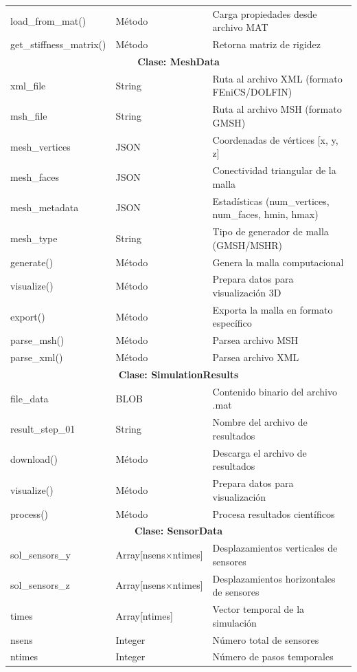 \begin{longtable}{|p{3cm}|p{2cm}|p{8cm}|}
load\_from\_mat() & Método & Carga propiedades desde archivo MAT \\
get\_stiffness\_matrix() & Método & Retorna matriz de rigidez \\
\hline
\multicolumn{3}{|c|}{\textbf{Clase: MeshData}} \\
\hline
xml\_file & String & Ruta al archivo XML (formato FEniCS/DOLFIN) \\
msh\_file & String & Ruta al archivo MSH (formato GMSH) \\
mesh\_vertices & JSON & Coordenadas de vértices [x, y, z] \\
mesh\_faces & JSON & Conectividad triangular de la malla \\
mesh\_metadata & JSON & Estadísticas (num\_vertices, num\_faces, hmin, hmax) \\
mesh\_type & String & Tipo de generador de malla (GMSH/MSHR) \\
generate() & Método & Genera la malla computacional \\
visualize() & Método & Prepara datos para visualización 3D \\
export() & Método & Exporta la malla en formato específico \\
parse\_msh() & Método & Parsea archivo MSH \\
parse\_xml() & Método & Parsea archivo XML \\
\hline
\multicolumn{3}{|c|}{\textbf{Clase: SimulationResults}} \\
\hline
file\_data & BLOB & Contenido binario del archivo .mat \\
result\_step\_01 & String & Nombre del archivo de resultados \\
download() & Método & Descarga el archivo de resultados \\
visualize() & Método & Prepara datos para visualización \\
process() & Método & Procesa resultados científicos \\
\hline
\multicolumn{3}{|c|}{\textbf{Clase: SensorData}} \\
\hline
sol\_sensors\_y & Array[nsens×ntimes] & Desplazamientos verticales de sensores \\
sol\_sensors\_z & Array[nsens×ntimes] & Desplazamientos horizontales de sensores \\
times & Array[ntimes] & Vector temporal de la simulación \\
nsens & Integer & Número total de sensores \\
ntimes & Integer & Número de pasos temporales \\

\end{longtable}
